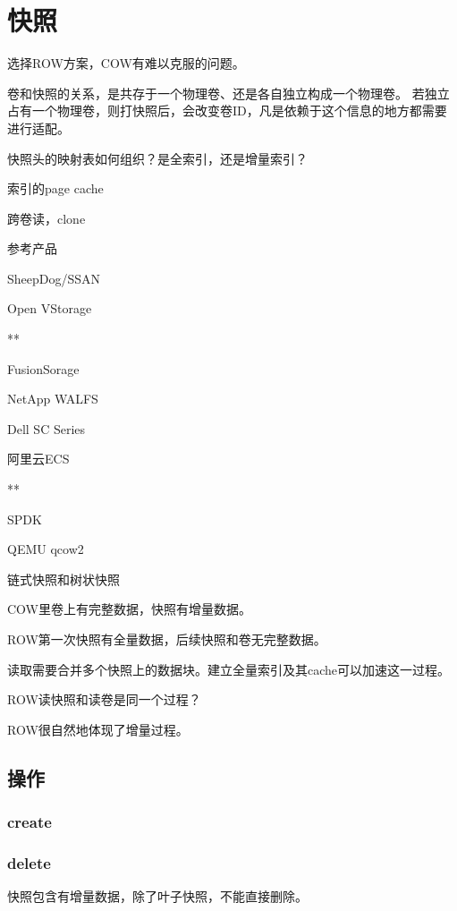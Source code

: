 \chapter{快照}

选择ROW方案，COW有难以克服的问题。

卷和快照的关系，是共存于一个物理卷、还是各自独立构成一个物理卷。
若独立占有一个物理卷，则打快照后，会改变卷ID，凡是依赖于这个信息的地方都需要进行适配。

快照头的映射表如何组织？是全索引，还是增量索引？

索引的page cache

跨卷读，clone

参考产品
\begin{enumbox}
\item SheepDog/SSAN
\item Open VStorage
\item ***
\item FusionSorage
\item NetApp WALFS
\item Dell SC Series
\item 阿里云ECS
\item ***
\item SPDK
\item QEMU qcow2
\end{enumbox}

链式快照和树状快照

COW里卷上有完整数据，快照有增量数据。

ROW第一次快照有全量数据，后续快照和卷无完整数据。

读取需要合并多个快照上的数据块。建立全量索引及其cache可以加速这一过程。

ROW读快照和读卷是同一个过程？

ROW很自然地体现了增量过程。

\section{操作}

\subsection{create}

\subsection{delete}

快照包含有增量数据，除了叶子快照，不能直接删除。

